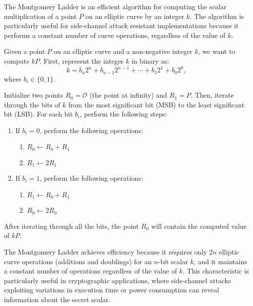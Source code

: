 \documentclass[12pt,openany]{book}
\theoremstyle{definition}
\begin{document}
	
	\newpage
	The Montgomery Ladder is an efficient algorithm for computing the scalar multiplication of a point $P$ on an elliptic curve by an integer $k$. The algorithm is particularly useful for side-channel attack resistant implementations because it performs a constant number of curve operations, regardless of the value of $k$.
	
	Given a point $P$ on an elliptic curve and a non-negative integer $k$, we want to compute $kP$. First, represent the integer $k$ in binary as:
	\[
	k = b_n 2^n + b_{n-1} 2^{n-1} + \cdots + b_1 2^1 + b_0 2^0,
	\]
	where $b_i \in \{0, 1\}$.
	
	Initialize two points $R_0 = \mathcal{O}$ (the point at infinity) and $R_1 = P$. Then, iterate through the bits of $k$ from the most significant bit (MSB) to the least significant bit (LSB). For each bit $b_i$, perform the following steps:
	
	\begin{enumerate}
		\item If $b_i = 0$, perform the following operations:
		\begin{enumerate}
			\item $R_0 \leftarrow R_0 + R_1$
			\item $R_1 \leftarrow 2R_1$
		\end{enumerate}
		\item If $b_i = 1$, perform the following operations:
		\begin{enumerate}
			\item $R_1 \leftarrow R_0 + R_1$
			\item $R_0 \leftarrow 2R_0$
		\end{enumerate}
	\end{enumerate}
	
	After iterating through all the bits, the point $R_0$ will contain the computed value of $kP$.
	
	The Montgomery Ladder achieves efficiency because it requires only $2n$ elliptic curve operations (additions and doublings) for an $n$-bit scalar $k$, and it maintains a constant number of operations regardless of the value of $k$. This characteristic is particularly useful in cryptographic applications, where side-channel attacks exploiting variations in execution time or power consumption can reveal information about the secret scalar.
	
\end{document}
